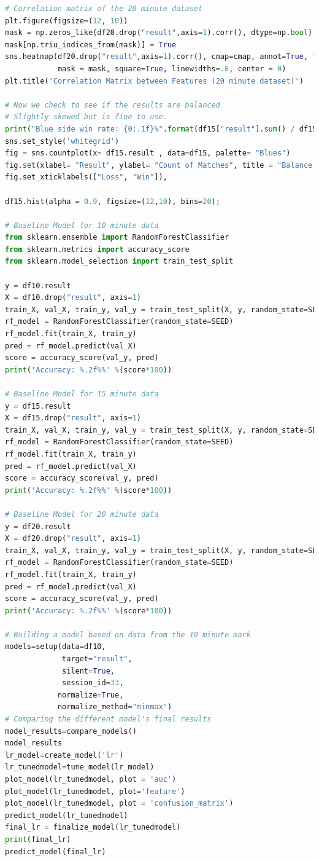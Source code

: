 \begin{lstlisting}[language=python,label={lst:pythoncode}]
# Correlation matrix of the 20 minute dataset
plt.figure(figsize=(12, 10))
mask = np.zeros_like(df20.drop("result",axis=1).corr(), dtype=np.bool)
mask[np.triu_indices_from(mask)] = True
sns.heatmap(df20.drop("result",axis=1).corr(), cmap=cmap, annot=True, fmt='.2f', vmin=-1, vmax=1,
            mask = mask, square=True, linewidths=.8, center = 0)
plt.title('Correlation Matrix between Features (20 minute dataset)')

# Now we check to see if the results are balanced
# Slightly skewed but is fine to use.
print("Blue side win rate: {0:.1f}%".format(df15["result"].sum() / df15["result"].shape[0]*100))
sns.set_style('whitegrid')
fig = sns.countplot(x= df15.result , data=df15, palette= "Blues")
fig.set(xlabel= "Result", ylabel= "Count of Matches", title = "Balance of the dataset")
fig.set_xticklabels(["Loss", "Win"]),

df15.hist(alpha = 0.9, figsize=(12,10), bins=20);

# Baseline Model for 10 minute data
from sklearn.ensemble import RandomForestClassifier
from sklearn.metrics import accuracy_score
from sklearn.model_selection import train_test_split

y = df10.result
X = df10.drop("result", axis=1)
train_X, val_X, train_y, val_y = train_test_split(X, y, random_state=SEED)
rf_model = RandomForestClassifier(random_state=SEED)
rf_model.fit(train_X, train_y)
pred = rf_model.predict(val_X)
score = accuracy_score(val_y, pred)
print('Accuracy: %.2f%%' %(score*100))

# Baseline Model for 15 minute data
y = df15.result
X = df15.drop("result", axis=1)
train_X, val_X, train_y, val_y = train_test_split(X, y, random_state=SEED)
rf_model = RandomForestClassifier(random_state=SEED)
rf_model.fit(train_X, train_y)
pred = rf_model.predict(val_X)
score = accuracy_score(val_y, pred)
print('Accuracy: %.2f%%' %(score*100))

# Baseline Model for 20 minute data
y = df20.result
X = df20.drop("result", axis=1)
train_X, val_X, train_y, val_y = train_test_split(X, y, random_state=SEED)
rf_model = RandomForestClassifier(random_state=SEED)
rf_model.fit(train_X, train_y)
pred = rf_model.predict(val_X)
score = accuracy_score(val_y, pred)
print('Accuracy: %.2f%%' %(score*100))

# Building a model based on data from the 10 minute mark
models=setup(data=df10,
             target="result",
             silent=True,
             session_id=33,
            normalize=True,
            normalize_method="minmax")
# Comparing the different model's final results
model_results=compare_models()
model_results
lr_model=create_model('lr')
lr_tunedmodel=tune_model(lr_model)
plot_model(lr_tunedmodel, plot = 'auc')
plot_model(lr_tunedmodel, plot='feature')
plot_model(lr_tunedmodel, plot = 'confusion_matrix')
predict_model(lr_tunedmodel)
final_lr = finalize_model(lr_tunedmodel)
print(final_lr)
predict_model(final_lr)


\end{lstlisting}

